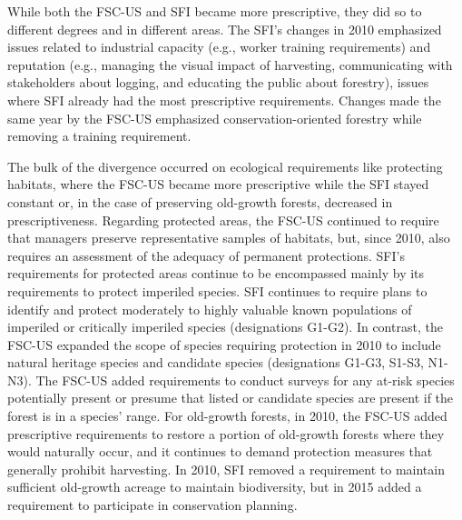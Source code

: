 \documentclass[
      12pt,
            Review ]{article}
\begin{document}


While both the FSC-US and SFI became more prescriptive, they did so to different degrees and in different areas. The SFI's changes in 2010 emphasized issues related to industrial capacity (e.g., worker training requirements) and reputation (e.g., managing the visual impact of harvesting, communicating with stakeholders about logging, and educating the public about forestry), issues where SFI already had the most prescriptive requirements. Changes made the same year by the FSC-US emphasized conservation-oriented forestry while removing a training requirement.

The bulk of the divergence occurred on ecological requirements like protecting habitats, where the FSC-US became more prescriptive while the SFI stayed constant or, in the case of preserving old-growth forests, decreased in prescriptiveness. Regarding protected areas, the FSC-US continued to require that managers preserve representative samples of habitats, but, since 2010, also requires an assessment of the adequacy of permanent protections. SFI's requirements for protected areas continue to be encompassed mainly by its requirements to protect imperiled species. SFI continues to require plans to identify and protect moderately to highly valuable known populations of imperiled or critically imperiled species (designations G1-G2). In contrast, the FSC-US expanded the scope of species requiring protection in 2010 to include natural heritage species and candidate species (designations G1-G3, S1-S3, N1-N3). The FSC-US added requirements to conduct surveys for any at-risk species potentially present or presume that listed or candidate species are present if the forest is in a species' range. For old-growth forests, in 2010, the FSC-US added prescriptive requirements to restore a portion of old-growth forests where they would naturally occur, and it continues to demand protection measures that generally prohibit harvesting. In 2010, SFI removed a requirement to maintain sufficient old-growth acreage to maintain biodiversity, but in 2015 added a requirement to participate in conservation planning.
\end{document}
